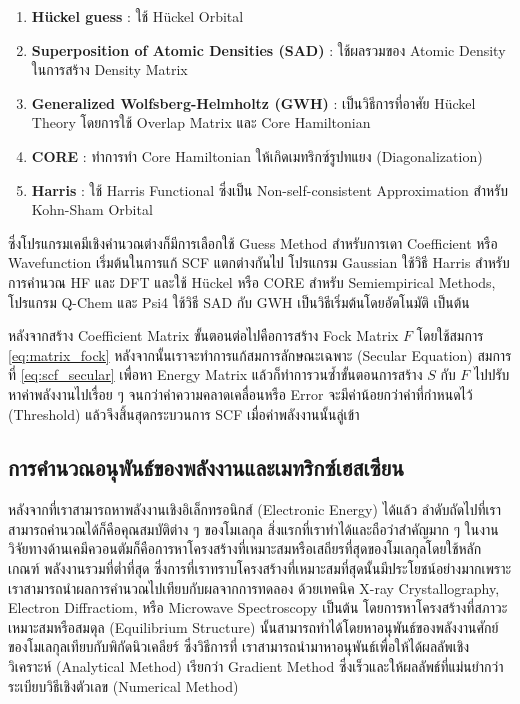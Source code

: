 \begin{enumerate}[topsep=0pt]
    \item \textbf{H{\"u}ckel guess} : ใช้ H{\"u}ckel Orbital\autocite{jensen2017}
    
    \item \textbf{Superposition of Atomic Densities (SAD)} : ใช้ผลรวมของ Atomic Density ในการสร้าง Density Matrix
    
    \item \textbf{Generalized Wolfsberg-Helmholtz (GWH)} : เป็นวิธีการที่อาศัย H{\"u}ckel Theory โดยการใช้ Overlap 
    Matrix และ Core Hamiltonian\autocite{wolfsberg1952}
    
    \item \textbf{CORE} : ทำการทำ Core Hamiltonian ให้เกิดเมทริกซ์รูปทแยง (Diagonalization)
    
    \item \textbf{Harris} : ใช้ Harris Functional ซึ่งเป็น Non-self-consistent Approximation สำหรับ Kohn-Sham 
    Orbital\autocite{harris1985}
\end{enumerate}

ซึ่งโปรแกรมเคมีเชิงคำนวณต่างก็มีการเลือกใช้ Guess Method สำหรับการเดา Coefficient หรือ Wavefunction เริ่มต้นในการแก้ SCF แตกต่างกันไป
โปรแกรม Gaussian ใช้วิธี Harris สำหรับการคำนวณ HF และ DFT และใช้ H{\"u}ckel หรือ CORE สำหรับ Semiempirical Methods, 
โปรแกรม Q-Chem และ Psi4 ใช้วิธี SAD กับ GWH เป็นวิธีเริ่มต้นโดยอัตโนมัติ เป็นต้น

หลังจากสร้าง Coefficient Matrix ขั้นตอนต่อไปคือการสร้าง Fock Matrix $F$ โดยใช้สมการ \ref{eq:matrix_fock} 
หลังจากนั้นเราจะทำการแก้สมการลักษณะเฉพาะ (Secular Equation) สมการที่ \ref{eq:scf_secular} เพื่อหา Energy Matrix 
แล้วก็ทำการวนซ้ำขั้นตอนการสร้าง $S$ กับ $F$ ไปปรับหาค่าพลังงานไปเรื่อย ๆ จนกว่าค่าความคลาดเคลื่อนหรือ Error จะมีค่าน้อยกว่าค่าที่กำหนดไว้ 
(Threshold) แล้วจึงสิ้นสุดกระบวนการ SCF เมื่อค่าพลังงานนั้นลู่เข้า

\subsection{การคำนวณอนุพันธ์ของพลังงานและเมทริกซ์เฮสเซียน}
\label{ssec:ener_der}

หลังจากที่เราสามารถหาพลังงานเชิงอิเล็กทรอนิกส์ (Electronic Energy) ได้แล้ว ลำดับถัดไปที่เราสามารถคำนวณได้ก็คือคุณสมบัติต่าง ๆ ของโมเลกุล
สิ่งแรกที่เราทำได้และถือว่าสำคัญมาก ๆ ในงานวิจัยทางด้านเคมีควอนตัมก็คือการหาโครงสร้างที่เหมาะสมหรือเสถียรที่สุดของโมเลกุลโดยใช้หลักเกณฑ์%
พลังงานรวมที่ต่ำที่สุด ซึ่งการที่เราทราบโครงสร้างที่เหมาะสมที่สุดนั้นมีประโยชน์อย่างมากเพราะเราสามารถนำผลการคำนวณไปเทียบกับผลจากการทดลอง%
ด้วยเทคนิค X-ray Crystallography, Electron Diffractiom, หรือ Microwave Spectroscopy เป็นต้น โดยการหาโครงสร้างที่สภาวะ%
เหมาะสมหรือสมดุล (Equilibrium Structure) นั้นสามารถทำได้โดยหาอนุพันธ์ของพลังงานศักย์ของโมเลกุลเทียบกับพิกัดนิวเคลียร์ ซึ่งวิธีการที่%
เราสามารถนำมาหาอนุพันธ์เพื่อให้ได้ผลลัพเชิงวิเคราะห์ (Analytical Method) เรียกว่า Gradient Method ซึ่งเร็วและให้ผลลัพธ์ที่แม่นยำกว่า%
ระเบียบวิธีเชิงตัวเลข (Numerical Method)

